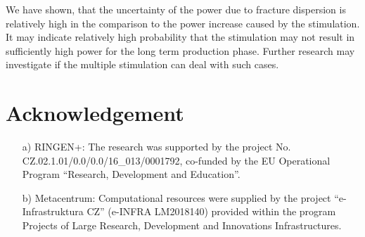 \documentclass{article}
\begin{document}
We have shown, that the uncertainty of the power due to fracture dispersion is relatively high in the comparison to the power increase caused by the stimulation. It may indicate relatively high probability that the stimulation may not result in sufficiently high power for the long term production phase. Further research may investigate if the multiple stimulation can deal with such cases.




\section*{Acknowledgement}
\begin{itemize}
    \item[a)] RINGEN+:
    The research was supported by the project No. CZ.02.1.01/0.0/0.0/16\_013/0001792, co-funded by the EU Operational Program ``Research, Development and Education''.
    
    \item[b)] Metacentrum:
    Computational resources were supplied by the project ``e-Infrastruktura CZ'' (e-INFRA LM2018140) provided within the program Projects of Large Research, Development and Innovations Infrastructures.
\end{itemize}



\end{document}
